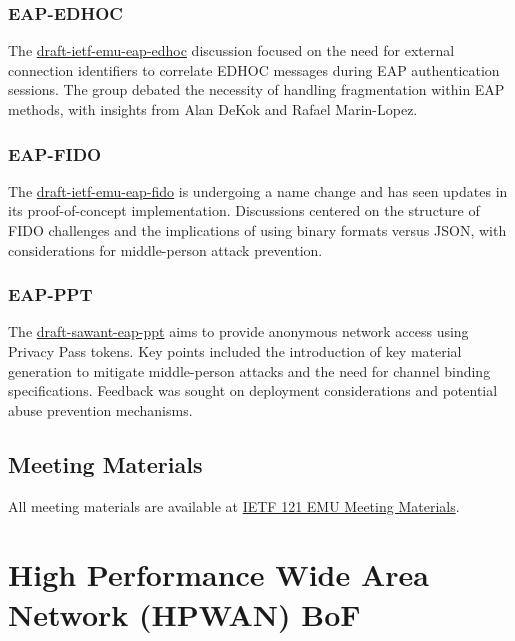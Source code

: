 \documentclass{article}
\begin{document}
\subsubsection{EAP-EDHOC}

The \href{https://datatracker.ietf.org/doc/html/draft-ietf-emu-eap-edhoc}{draft-ietf-emu-eap-edhoc} discussion focused on the need for external connection identifiers to correlate EDHOC messages during EAP authentication sessions. The group debated the necessity of handling fragmentation within EAP methods, with insights from Alan DeKok and Rafael Marin-Lopez.

\subsubsection{EAP-FIDO}

The \href{https://datatracker.ietf.org/doc/html/draft-ietf-emu-eap-fido}{draft-ietf-emu-eap-fido} is undergoing a name change and has seen updates in its proof-of-concept implementation. Discussions centered on the structure of FIDO challenges and the implications of using binary formats versus JSON, with considerations for middle-person attack prevention.

\subsubsection{EAP-PPT}

The \href{https://datatracker.ietf.org/doc/html/draft-sawant-eap-ppt}{draft-sawant-eap-ppt} aims to provide anonymous network access using Privacy Pass tokens. Key points included the introduction of key material generation to mitigate middle-person attacks and the need for channel binding specifications. Feedback was sought on deployment considerations and potential abuse prevention mechanisms.

\subsection{Meeting Materials}

All meeting materials are available at \href{https://datatracker.ietf.org/meeting/121/materials/agenda-121-emu}{IETF 121 EMU Meeting Materials}.






\newpage

\section{High Performance Wide Area Network (HPWAN) BoF}
\end{document}
